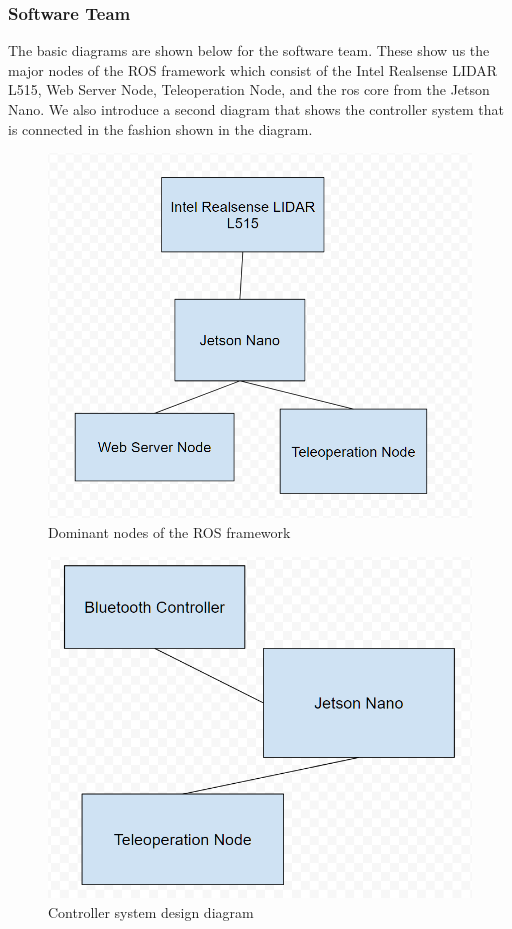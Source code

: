 \documentclass[a4paper, 10pt]{article}
\begin{document}
        \pagebreak 
        \subsubsection{Software Team}
        The basic diagrams are shown below for the software team. These show us the major nodes of the ROS framework which consist of the Intel Realsense LIDAR L515, Web Server Node, Teleoperation Node, and the ros core from the Jetson Nano.
        We also introduce a second diagram that shows the controller system that is connected in the fashion shown in the diagram.
        \begin{figure} [!h]
			\centering
			\includegraphics[scale=0.35]{Photos/LIDAR nodes}
			\caption{Dominant nodes of the ROS framework}
			\label{dominant_nodes}
		\end{figure}

        \begin{figure} [!h]
			\centering
			\includegraphics[scale=0.35]{Photos/controller node}
			\caption{Controller system design diagram}
			\label{control_nodes}
		\end{figure}
\end{document}
